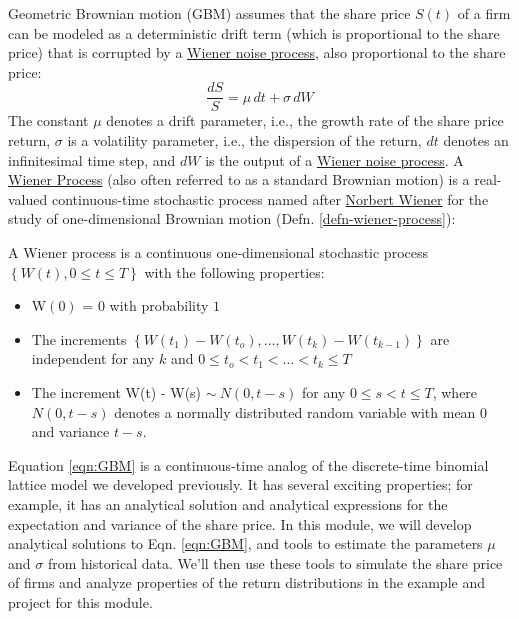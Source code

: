 \documentclass[11pt]{article}
\theoremstyle{definition}
\begin{document}
Geometric Brownian motion (GBM) assumes that the share price $S(t)$ of a firm can be modeled as a deterministic
drift term (which is proportional to the share price) that is corrupted by a \href{https://en.wikipedia.org/wiki/Wiener_process}{Wiener noise process}, also proportional to the share price:
\begin{equation}\label{eqn:GBM}
\frac{dS}{S} = {\mu}\,dt + \sigma\,{dW}
\end{equation}
The constant $\mu$ denotes a drift parameter, i.e., the growth rate of the share price return, $\sigma$ is a volatility parameter, i.e., 
the dispersion of the return, $dt$ denotes an infinitesimal time step, and $dW$ is the output of a 
\href{https://en.wikipedia.org/wiki/Wiener_process}{Wiener noise process}.  A \href{https://en.wikipedia.org/wiki/Wiener_process)}{Wiener Process} 
(also often referred to as a standard Brownian motion) is a real-valued continuous-time stochastic 
process named after \href{https://en.wikipedia.org/wiki/Norbert_Wiener}{Norbert Wiener} for the study of one-dimensional Brownian motion (Defn. \ref{defn-wiener-process}):
\begin{definition}\label{defn-wiener-process}
A Wiener process is a continuous one-dimensional stochastic process $\left\{W\left(t\right), 0\leq{t}\leq{T}\right\}$ with the following properties:
\begin{itemize}
\setlength\itemsep{0em}
\item{W$\left(0\right)$ = $0$ with probability $1$}
\item{The increments $\left\{W(t_{1}) - W(t_{o}),\dots, W(t_{k}) - W(t_{k-1})\right\}$ are independent for any $k$ and $0\leq{t_{o}}< t_{1} < \dots < t_{k} \leq{T}$}
\item{The increment W(t) - W(s) $\sim~N\left(0,t-s\right)$ for any $0\leq{s}< t \leq{T}$, where $N\left(0,t-s\right)$ denotes a normally distributed random variable with mean $0$ and variance $t - s$.}
\end{itemize}
\end{definition}
Equation \ref{eqn:GBM} is a continuous-time analog of the discrete-time binomial lattice model we developed previously. 
It has several exciting properties; for example, it has an analytical solution and analytical expressions for the expectation and variance of the share price. In this module, we will develop analytical solutions to Eqn. \ref{eqn:GBM}, and tools to estimate the parameters $\mu$ and $\sigma$ from historical data. We'll then use these tools to simulate the share price of firms and analyze properties of the return distributions in the example and project for this module. 
\end{document}
